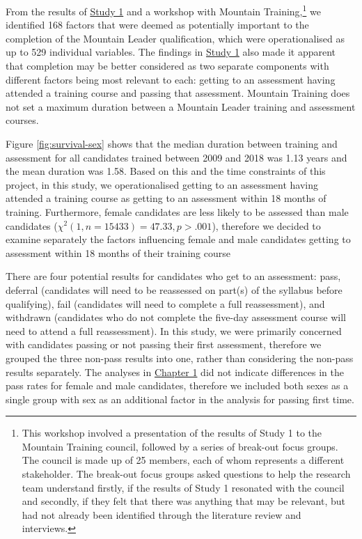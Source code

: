 \documentclass[
  12pt,
  a4paper,
]{book}
\begin{document}
From the results of \protect\hyperlink{ml-qualitative}{Study 1} and a workshop with Mountain Training,\footnote{This workshop involved a presentation of the results of Study 1 to the Mountain Training council, followed by a series of break-out focus groups. The council is made up of 25 members, each of whom represents a different stakeholder. The break-out focus groups asked questions to help the research team understand firstly, if the results of Study 1 resonated with the council and secondly, if they felt that there was anything that may be relevant, but had not already been identified through the literature review and interviews.} we identified 168 factors that were deemed as potentially important to the completion of the Mountain Leader qualification, which were operationalised as up to 529 individual variables. The findings in \protect\hyperlink{ml-qualitative}{Study 1} also made it apparent that completion may be better considered as two separate components with different factors being most relevant to each: getting to an assessment having attended a training course and passing that assessment. Mountain Training does not set a maximum duration between a Mountain Leader training and assessment courses.

Figure \ref{fig:survival-sex} shows that the median duration between training and assessment for all candidates trained between 2009 and 2018 was 1.13 years and the mean duration was 1.58. Based on this and the time constraints of this project, in this study, we operationalised getting to an assessment having attended a training course as getting to an assessment within 18 months of training. Furthermore, female candidates are less likely to be assessed than male candidates (\(\chi^2( 1 ,n = 15433 )= 47.33 ,p>.001\)), therefore we decided to examine separately the factors influencing female and male candidates getting to assessment within 18 months of their training course

There are four potential results for candidates who get to an assessment: pass, deferral (candidates will need to be reassessed on part(s) of the syllabus before qualifying), fail (candidates will need to complete a full reassessment), and withdrawn (candidates who do not complete the five-day assessment course will need to attend a full reassessment). In this study, we were primarily concerned with candidates passing or not passing their first assessment, therefore we grouped the three non-pass results into one, rather than considering the non-pass results separately. The analyses in \protect\hyperlink{gen-intro}{Chapter 1} did not indicate differences in the pass rates for female and male candidates, therefore we included both sexes as a single group with sex as an additional factor in the analysis for passing first time.
\end{document}
